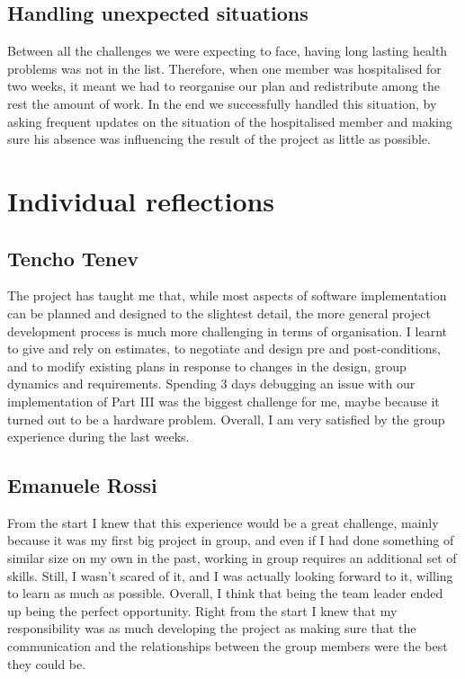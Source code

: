 \documentclass[11pt]{article}
\begin{document}
\subsection{Handling unexpected situations}
Between all the challenges we were expecting to face, having long lasting health problems was not in the list. Therefore, when one member was hospitalised for two weeks, it meant we had to reorganise our plan and redistribute among the rest the amount of work. In the end we successfully handled this situation, by asking frequent updates on the situation of the hospitalised member and making sure his absence was influencing the result of the project as little as possible.

\section{Individual reflections}

\subsection{Tencho Tenev}
The project has taught me that, while most aspects of software implementation can be planned and designed to the slightest detail, the more general project development process is much more challenging in terms of organisation. I learnt to give and rely on estimates, to negotiate and design pre and post-conditions, and to modify existing plans in response to changes in the design, group dynamics and requirements. Spending 3 days debugging an issue with our implementation of Part III was the biggest challenge for me, maybe because it turned out to be a hardware problem. Overall, I am very satisfied by the group experience during the last weeks.

\subsection{Emanuele Rossi}
From the start I knew that this experience would be a great challenge, mainly because it was my first big project in group, and even if I had done something of similar size on my own in the past, working in group requires an additional set of skills. 
Still, I wasn't scared of it, and I was actually looking forward to it, willing to learn as much as possible. Overall, I think that being the team leader ended up being the perfect opportunity. 
Right from the start I knew that my responsibility was as much developing the project as making sure that the communication and the relationships between the group members were the best they could be.
\end{document}
